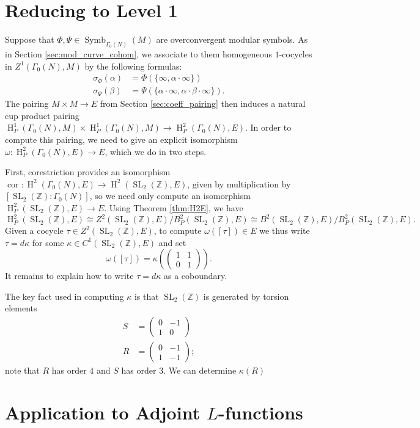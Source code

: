 \documentclass[10pt]{amsart}
\theoremstyle{plain}
\theoremstyle{definition}
\newcommand{\ZZ}{{\mathbb{Z}}}
\DeclareMathOperator{\SL}{SL}
\DeclareMathOperator{\Symb}{Symb}
\DeclareMathOperator{\Hh}{H}
\DeclareMathOperator{\cor}{cor}
\begin{document}
\section{Reducing to Level 1} \label{sec:level_one}

Suppose that $\Phi, \Psi \in \Symb_{\Gamma_0(N)}(M)$ are overconvergent modular symbols.  As in Section \ref{sec:mod_curve_cohom}, we associate to them homogeneous $1$-cocycles in $Z^1(\Gamma_0(N), M)$ by the following formulas:
\begin{align*}
\sigma_{\Phi}(\alpha) &= \Phi(\{\infty, \alpha \cdot \infty\}) \\
\sigma_{\Psi}(\beta) &= \Psi(\{\alpha \cdot \infty, \alpha \cdot \beta \cdot \infty\}).
\end{align*}
The pairing $M \times M \to E$ from Section \ref{sec:coeff_pairing} then induces a natural cup product pairing $\Hh^1_P(\Gamma_0(N), M) \times \Hh^1_P(\Gamma_0(N), M) \to \Hh^2_P(\Gamma_0(N), E)$.  In order to compute this pairing, we need to give an explicit isomorphism $\omega : \Hh^2_P(\Gamma_0(N), E) \to E$, which we do in two steps.

First, corestriction provides an isomorphism $\cor : \Hh^2(\Gamma_0(N), E) \to \Hh^2(\SL_2(\ZZ), E)$, given by multiplication by $[\SL_2(\ZZ) : \Gamma_0(N)]$,  so we need only compute an isomorphism $\Hh^2_P(\SL_2(\ZZ), E) \to E$.  Using Theorem \ref{thm:H2E}, we have
\[
\Hh^2_P(\SL_2(\ZZ), E) \cong Z^2(\SL_2(\ZZ), E) / B^2_P(\SL_2(\ZZ), E) \cong B^2(\SL_2(\ZZ), E) / B^2_P(\SL_2(\ZZ), E).
\]
Given a cocycle $\tau \in Z^2(\SL_2(\ZZ), E)$, to compute $\omega([\tau]) \in E$ we thus write $\tau = d\kappa$ for some $\kappa \in C^1(\SL_2(\ZZ), E)$ and set
\[
\omega([\tau]) = \kappa\left( \begin{pmatrix} 1 & 1 \\ 0 & 1 \end{pmatrix}\right).
\]
It remains to explain how to write $\tau = d\kappa$ as a coboundary.

The key fact used in computing $\kappa$ is that $\SL_2(\ZZ)$ is generated by torsion elements
\begin{align*}
S &= \begin{pmatrix} 0 & -1 \\ 1 & 0 \end{pmatrix} \\
R &= \begin{pmatrix} 0 & -1 \\ 1 & -1 \end{pmatrix};
\end{align*}
note that $R$ has order $4$ and $S$ has order $3$.  We can determine $\kappa(R)$

\section{Application to Adjoint $L$-functions} \label{sec:adjoint}
\end{document}
